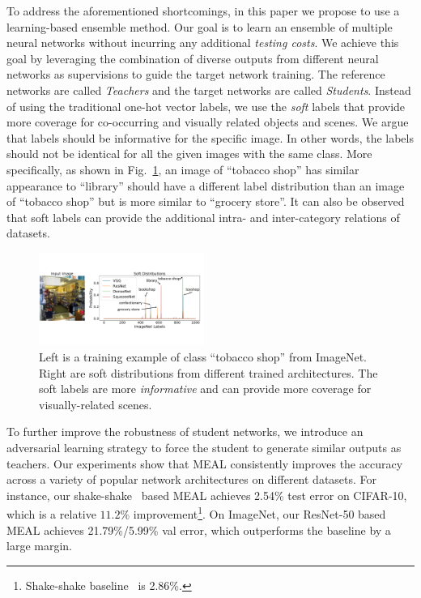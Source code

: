 \documentclass[letterpaper]{article} %
\begin{document}
To address the aforementioned shortcomings, in this paper we propose to use a learning-based ensemble method. Our goal is to learn an ensemble of multiple neural networks without incurring any additional {\em {testing costs}}. We achieve this goal by leveraging the combination of diverse outputs from different neural networks as supervisions to guide the target network training. The reference networks are called {\em {Teachers}} and the target networks are called {\em {Students}}. Instead of using the traditional one-hot vector labels, we use the {\em {soft}} labels that provide more coverage for co-occurring and visually related objects and scenes. We argue that labels should be informative for the specific image. In other words, the labels should not be identical for all the given images with the same class. More specifically, as shown in Fig.~\ref{soft_labels}, an image of ``tobacco shop'' has similar appearance to ``library'' should have a different label distribution than an image of ``tobacco shop'' but is more similar to ``grocery store''. It can also be observed that soft labels can provide the additional intra- and inter-category relations of datasets.


\begin{figure}[t]
	\centering
	\includegraphics[width=0.48\textwidth]{figs/soft_labels}
	\vspace{-0.20in}
	\caption{Left is a training example of class ``tobacco shop'' from ImageNet. Right are soft distributions from different trained architectures. The soft labels are more {\em {informative}} and can provide more coverage for visually-related scenes.}
	\label{soft_labels}
	\vspace{-0.1in}
\end{figure}

To further improve the robustness of student networks, we introduce an adversarial learning strategy to force the student to generate similar outputs as teachers.
Our experiments show that MEAL consistently improves the accuracy across a variety of popular network architectures on different datasets. For instance, our shake-shake~\cite{gastaldi2017shake} based MEAL achieves 2.54\% test error on CIFAR-10, which is a relative $11.2\%$ improvement\footnote{Shake-shake baseline~\cite{gastaldi2017shake} is 2.86\%.}. On ImageNet, our ResNet-50 based MEAL achieves 21.79\%/5.99\% val error, which outperforms the baseline by a large margin.
\end{document}
